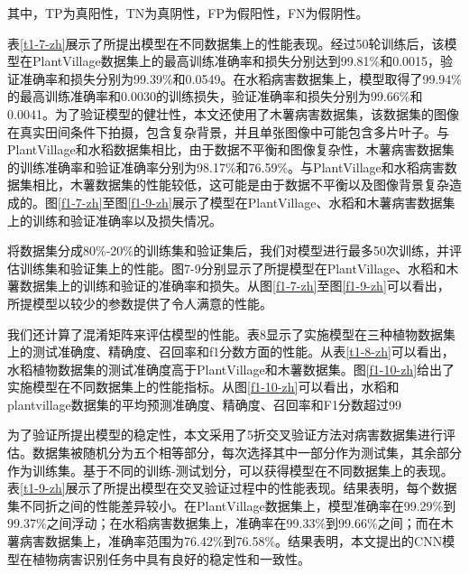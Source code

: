 其中，TP为真阳性，TN为真阴性，FP为假阳性，FN为假阴性。

表\ref{t1-7-zh}展示了所提出模型在不同数据集上的性能表现。经过50轮训练后，该模型在PlantVillage数据集上的最高训练准确率和损失分别达到99.81\%和0.0015，验证准确率和损失分别为99.39\%和0.0549。在水稻病害数据集上，模型取得了99.94\%的最高训练准确率和0.0030的训练损失，验证准确率和损失分别为99.66\%和0.0041。为了验证模型的健壮性，本文还使用了木薯病害数据集，该数据集的图像在真实田间条件下拍摄，包含复杂背景，并且单张图像中可能包含多片叶子。与PlantVillage和水稻数据集相比，由于数据不平衡和图像复杂性，木薯病害数据集的训练准确率和验证准确率分别为98.17\%和76.59\%。与PlantVillage和水稻病害数据集相比，木薯数据集的性能较低，这可能是由于数据不平衡以及图像背景复杂造成的。图\ref{f1-7-zh}至图\ref{f1-9-zh}展示了模型在PlantVillage、水稻和木薯病害数据集上的训练和验证准确率以及损失情况。


将数据集分成80\%-20\%的训练集和验证集后，我们对模型进行最多50次训练，并评估训练集和验证集上的性能。图7-9分别显示了所提模型在PlantVillage、水稻和木薯数据集上的训练和验证的准确率和损失。从图\ref{f1-7-zh}至图\ref{f1-9-zh}可以看出，所提模型以较少的参数提供了令人满意的性能。




我们还计算了混淆矩阵来评估模型的性能。表8显示了实施模型在三种植物数据集上的测试准确度、精确度、召回率和f1分数方面的性能。从表\ref{t1-8-zh}可以看出，水稻植物数据集的测试准确度高于PlantVillage和木薯数据集。图\ref{f1-10-zh}给出了实施模型在不同数据集上的性能指标。从图\ref{f1-10-zh}可以看出，水稻和plantvillage数据集的平均预测准确度、精确度、召回率和F1分数超过99%



为了验证所提出模型的稳定性，本文采用了5折交叉验证方法对病害数据集进行评估。数据集被随机分为五个相等部分，每次选择其中一部分作为测试集，其余部分作为训练集。基于不同的训练-测试划分，可以获得模型在不同数据集上的表现。表\ref{t1-9-zh}展示了所提出模型在交叉验证过程中的性能表现。结果表明，每个数据集不同折之间的性能差异较小。在PlantVillage数据集上，模型准确率在99.29\%到99.37\%之间浮动；在水稻病害数据集上，准确率在99.33\%到99.66\%之间；而在木薯病害数据集上，准确率范围为76.42\%到76.58\%。结果表明，本文提出的CNN模型在植物病害识别任务中具有良好的稳定性和一致性。

